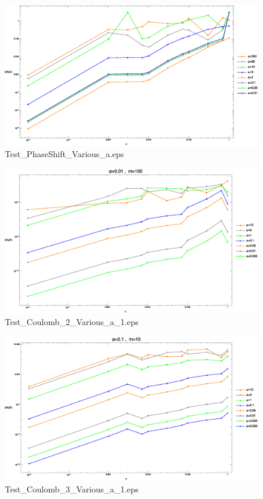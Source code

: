 \documentclass[hyperref]{ctexart}
\date{}
\begin{document}
\begin{figure}
  \centering
  \includegraphics[width=6in]{Test_PhaseShift_Various_a.eps}
  \caption{Test\_PhaseShift\_Various\_a.eps}
\end{figure}
\begin{figure}
  \centering
  \includegraphics[width=6in]{Test_Coulomb_2_Various_a_1.eps}
  \caption{Test\_Coulomb\_2\_Various\_a\_1.eps}
\end{figure}
\begin{figure}
  \centering
  \includegraphics[width=6in]{Test_Coulomb_3_Various_a_1.eps}
  \caption{Test\_Coulomb\_3\_Various\_a\_1.eps}
\end{figure}
\end{document}
